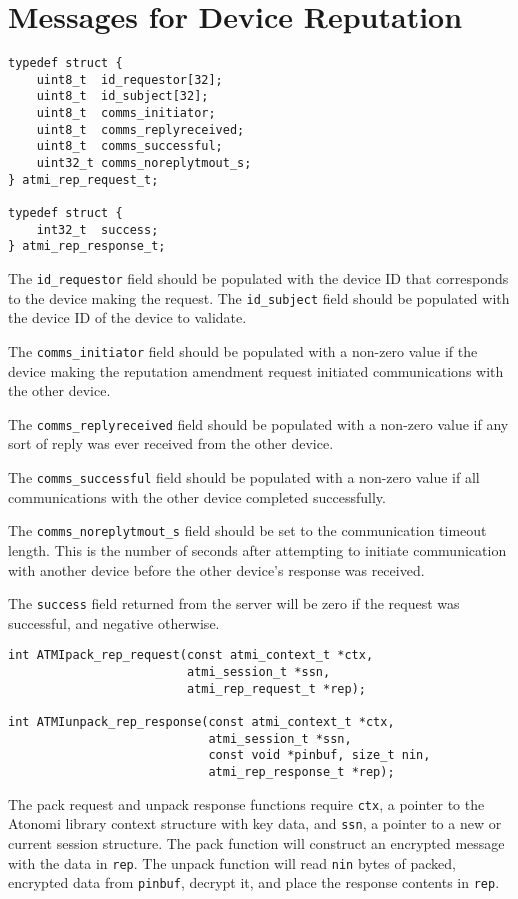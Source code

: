 \section{Messages for Device Reputation}
\begin{lstlisting}[float=h,name=Reputation Request and Response Structures]
typedef struct {
	uint8_t  id_requestor[32];
	uint8_t  id_subject[32];
	uint8_t  comms_initiator;
	uint8_t  comms_replyreceived;
	uint8_t  comms_successful;
	uint32_t comms_noreplytmout_s;
} atmi_rep_request_t;

typedef struct {
	int32_t  success;
} atmi_rep_response_t;
\end{lstlisting}

The \texttt{id_requestor} field should be populated with the device ID that
corresponds to the device making the request. The \texttt{id_subject} field
should be populated with the device ID of the device to validate.

The \texttt{comms_initiator} field should be populated with a non-zero value
if the device making the reputation amendment request initiated communications
with the other device.

The \texttt{comms_replyreceived} field should be populated with a non-zero value
if any sort of reply was ever received from the other device.

The \texttt{comms_successful} field should be populated with a non-zero value
if all communications with the other device completed successfully.

The \texttt{comms_noreplytmout_s} field should be set to the communication
timeout length. This is the number of seconds after attempting to initiate
communication with another device before the other device's response was
received.

The \texttt{success} field returned from the server will be zero if the
request was successful, and negative otherwise.


\begin{lstlisting}[name=Reputation Request Packing and Response Unpacking Functions]
int ATMIpack_rep_request(const atmi_context_t *ctx,
                         atmi_session_t *ssn,
                         atmi_rep_request_t *rep);

int ATMIunpack_rep_response(const atmi_context_t *ctx,
                            atmi_session_t *ssn,
                            const void *pinbuf, size_t nin,
                            atmi_rep_response_t *rep);
\end{lstlisting}

The pack request and unpack response functions require \texttt{ctx}, a pointer
to the Atonomi library context structure with key data, and \texttt{ssn},
a pointer to a new or current session structure. The pack function will
construct an encrypted message with the data in \texttt{rep}. The unpack function
will read \texttt{nin} bytes of packed, encrypted data from \texttt{pinbuf},
decrypt it, and place the response contents in \texttt{rep}.

